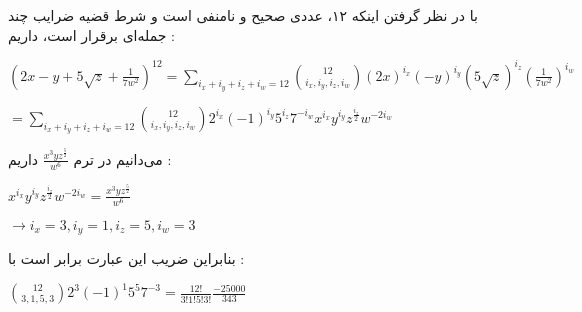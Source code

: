 با در نظر گرفتن اینکه ۱۲، عددی صحیح و نا‌منفی است و شرط قضیه ضرایب چند جمله‌ای برقرار است، داریم :
\begin{center}
  $(2x - y + 5\sqrt{z} + \frac{1}{7w^2})^12 = \sum\limits_{i_x+i_y+i_z+i_w=12} \binom{12}{i_x,i_y,i_z,i_w} (2x)^{i_x} (-y)^{i_y} (5\sqrt{z})^{i_z} (\frac{1}{7w^2})^{i_w}$

  $= \sum\limits_{i_x+i_y+i_z+i_w=12} \binom{12}{i_x,i_y,i_z,i_w} 2^{i_x} (-1)^{i_y} 5^{i_z} 7^{-i_w} x^{i_x} y^{i_y} z^{\frac{i_z}{2}} w^{-2i_w}$
\end{center}
می‌دانیم در ترم 
$\frac{x^3 y z^{\frac{5}{2}}}{w^6}$
داریم :
\begin{center}
  $x^{i_x} y^{i_y} z^{\frac{i_z}{2}} w^{-2i_w} = \frac{x^3 y z^{\frac{5}{2}}}{w^6}$

  $\rightarrow i_x = 3 , i_y = 1 , i_z = 5 , i_w = 3$
\end{center}
بنابراین ضریب این عبارت برابر است با :
\begin{center}
  $\binom{12}{3,1,5,3} 2^3 (-1)^1 5^5 7^{-3} = \frac{12!}{3!1!5!3!} \frac{-25000}{343}$
\end{center}